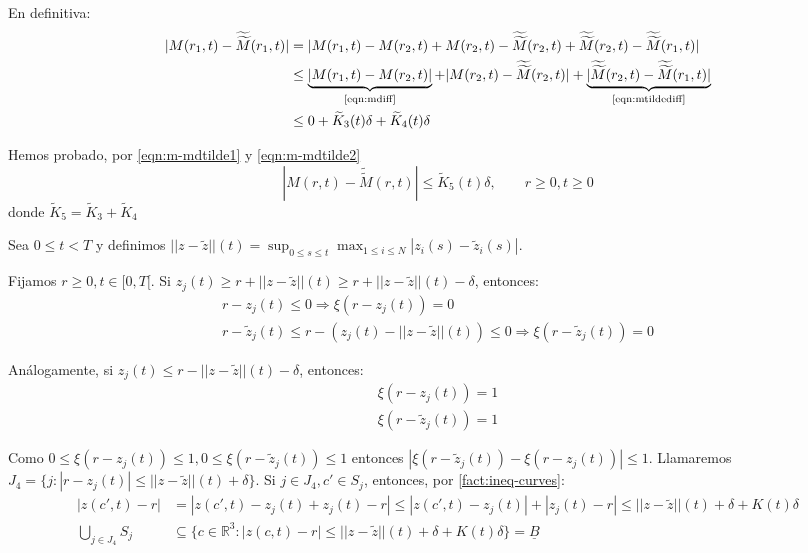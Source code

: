 \documentclass[a4paper,10pt]{scrartcl}
\theoremstyle{definition}
\newcommand{\ktilde}{\widetilde{K}}
\newcommand{\dtilde}[1]{\widetilde{\widetilde{#1}}}
\numberwithin{equation}{section}
\begin{document}
 En definitiva:
 \begin{align}  
|M(r_1,t) - \dtilde{M}(r_1,t)| &= |M(r_1,t) - M(r_2,t) + M(r_2,t) - \dtilde{M}(r_2,t) + \dtilde{M}(r_2,t) - \dtilde{M}(r_1,t)| \nonumber \\
&\le \underbrace{|M(r_1,t) - M(r_2,t)|}_{\textrm{\eqref{eqn:mdiff}}} + |M(r_2,t) - \dtilde{M}(r_2,t)| + \underbrace{|\dtilde{M}(r_2,t) - \dtilde{M}(r_1,t)|}_{\textrm{\eqref{eqn:mtildediff}}} \nonumber \\
&\le 0 + \ktilde_3(t) \delta + \ktilde_4(t) \delta \label{eqn:m-mdtilde2}
 \end{align}

 Hemos probado, por \eqref{eqn:m-mdtilde1} y  \eqref{eqn:m-mdtilde2}
 \begin{equation}
  |M(r,t) - \dtilde{M}(r,t)| \le \ktilde_5(t) \delta, \qquad r\ge 0, t\ge 0
  \label{eqn:m-mdtilde}
 \end{equation}
 donde $\ktilde_5 = \ktilde_3 + \ktilde_4$

 Sea $0\le t < T$ y definimos $||z-\widetilde{z}||(t) = \sup_{0\le s \le t} \max_{1\le i\le N} |z_i(s) - \widetilde{z}_i(s)|$.
 
 Fijamos $r\ge 0, t\in [0, T[$. Si $z_j(t) \ge r + ||z - \widetilde{z}||(t) \ge r + ||z - \widetilde{z}||(t) - \delta$, entonces:
 \begin{align*}
  r - z_j(t) \le 0 \Rightarrow \xi(r - z_j(t)) = 0\\
  r - \widetilde{z}_j(t) \le r - (z_j(t) - ||z-\widetilde{z}||(t)) \le 0 \Rightarrow \xi(r - \widetilde{z}_j(t)) = 0
 \end{align*}
 
 Análogamente, si $z_j(t) \le r - ||z - \widetilde{z}||(t) - \delta$, entonces:
  \begin{align*}
  \xi(r - z_j(t)) = 1\\
  \xi(r - \widetilde{z}_j(t)) = 1
 \end{align*}
 
 Como $0 \le \xi(r - z_j(t)) \le 1, 0 \le \xi(r - \widetilde{z}_j(t)) \le 1$ entonces $|\xi(r - \widetilde{z}_j(t)) - \xi(r - z_j(t))| \le 1$. Llamaremos $J_4 = \{j: |r-z_j(t)| \le ||z - \widetilde{z}||(t) + \delta\}$.  Si $j\in J_4, c' \in S_j$, entonces, por \cref{fact:ineq-curves}:
 \begin{align*}
  |z(c',t) - r| &= |z(c',t) - z_j(t) + z_j(t) - r| \le |z(c',t) - z_j(t)| + |z_j(t) - r| \le ||z-\widetilde{z}||(t) + \delta + K(t)\delta\\
  \bigcup_{j\in J_4} S_j &\subseteq \{c\in \mathbb{R}^3: |z(c,t) - r| \le ||z-\widetilde{z}||(t) + \delta + K(t)\delta\} = \underline{B}
 \end{align*}
\end{document}
